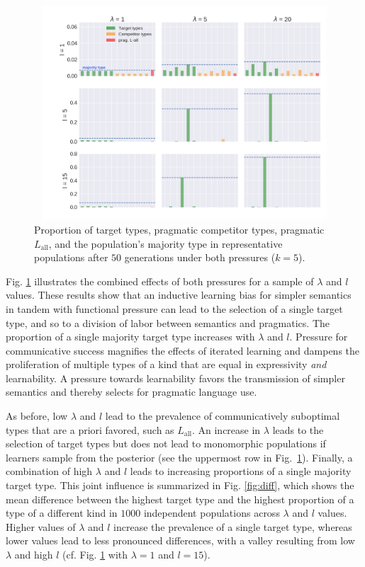 \documentclass[a4paper, 11pt]{article}
\theoremstyle{Satz}
\newcommand{\mylang}[1]{\ensuremath{L_{\text{#1}}}\xspace} %
\newcommand{\Lall}{\mylang{all}}
\begin{document}
\begin{figure}[t]
\centering
\includegraphics[width=1\textwidth,height=8cm,keepaspectratio]{./plots/alt-fig3-r+m}
\caption{Proportion of target types, pragmatic competitor types, pragmatic $\Lall$, and the population's majority type in representative populations after $50$ generations under both pressures ($k = 5$).}
\label{fig:rmd}
\end{figure}

Fig. \ref{fig:rmd} illustrates the combined effects of both pressures for a sample of
$\lambda$ and $l$ values. These results show that an inductive learning bias for simpler
semantics in tandem with functional pressure can lead to the selection of a single target
type, and so to a division of labor between semantics and pragmatics.
The proportion of a single majority target type increases with $\lambda$ and
$l$. Pressure for communicative success magnifies the effects of iterated learning and dampens
the proliferation of multiple types of a kind that are equal in expressivity {\em and} learnability. A
pressure towards learnability favors the transmission of simpler semantics and thereby selects
for pragmatic language use.

As before, low $\lambda$ and $l$ lead to the prevalence of communicatively suboptimal types
that are a priori favored, such as $\Lall$. An increase in $\lambda$ leads to the selection of
target types but does not lead to monomorphic populations if learners sample from the
posterior (see the uppermost row in Fig.~\ref{fig:rmd}). Finally, a combination of high $\lambda$ and $l$ leads to increasing proportions of
a single majority target type. This joint influence is summarized in Fig. \ref{fig:diff}, which shows the mean difference between the highest target type and the highest proportion of a type of a different kind in $1000$ independent populations across $\lambda$ and $l$ values. Higher values of $\lambda$ and $l$ increase the prevalence of a single target type, whereas lower values lead to less pronounced differences, with a valley resulting from low $\lambda$ and high $l$ (cf. Fig. \ref{fig:rmd} with $\lambda = 1$ and $l=15$). 
\end{document}
